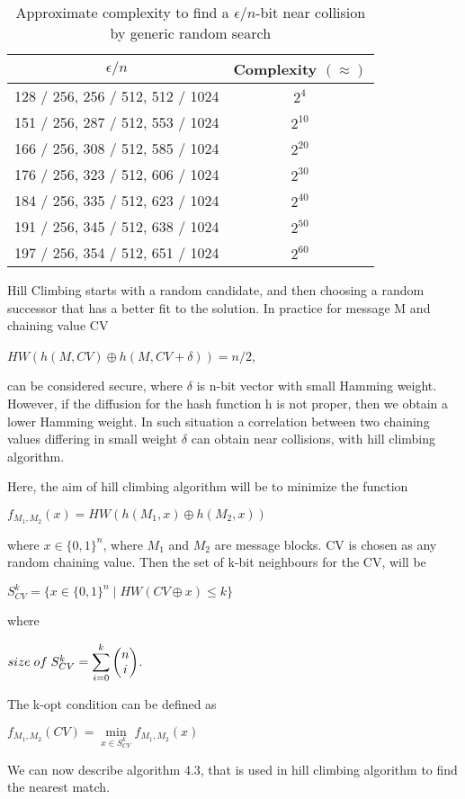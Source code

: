 \begin{table}[h]
  \begin{center}
    \begin{tabular}{ | c | c | } \hline
      $\epsilon / n $                         & Complexity $( \approx )$ \\ \hline
      128 / 256, 256 / 512, 512 / 1024 & $2^{4}$ \\ \hline
      151 / 256, 287 / 512, 553 / 1024 & $2^{10}$ \\ \hline
      166 / 256, 308 / 512, 585 / 1024 & $2^{20}$ \\ \hline
      176 / 256, 323 / 512, 606 / 1024 & $2^{30}$ \\ \hline
      184 / 256, 335 / 512, 623 / 1024 & $2^{40}$ \\ \hline
      191 / 256, 345 / 512, 638 / 1024 & $2^{50}$ \\ \hline
      197 / 256, 354 / 512, 651 / 1024 & $2^{60}$ \\ \hline
    \end{tabular}
    \caption{Approximate complexity to find a $\epsilon / n$-bit near collision by generic random search \cite{00029}}
  \end{center}
\end{table}

Hill Climbing starts with a random candidate, and then choosing a random successor that has a better fit to the
solution. In practice for message M and chaining value CV 
\begin{center}$HW( h(M, CV) \oplus h(M, CV + \delta) ) = n / 2 $,\end{center}
can be considered secure, where $\delta$ is n-bit vector with small Hamming weight. However, if the diffusion for the 
hash function h is not proper, then we obtain a lower Hamming weight. In such situation a correlation between two 
chaining values differing in small weight $\delta$ can obtain near collisions, with hill climbing algorithm.

Here, the aim of hill climbing algorithm will be to minimize the function 
\begin{center}$f_{M_{1}, M_{2}}(x) = HW( h(M_{1}, x) \oplus h(M_{2}, x) )$\end{center}
where $x \in \{0, 1\}^{n}$, where $M_{1}$ and $M_{2}$ are message blocks. CV is chosen as any random chaining value. Then the 
set of k-bit neighbours for the CV, will be 
\begin{center}$S^{k}_{CV} = \{ x \in \{0, 1\}^{n} \mid HW( CV \oplus x ) \leq k \}$\end{center}
where 
\begin{center}$ size \thickspace of \thickspace S^{k}_{CV} = \displaystyle \sum \limits_{i = 0}^{k} \begin{pmatrix} n \\ i \end{pmatrix}$.\end{center}
The k-opt condition can be defined as 
\begin{center}$f_{M_{1}, M_{2}} (CV) =  \min\limits_{x \in S^{k}_{CV}} f_{M_{1}, M_{2}} (x)$\end{center}
We can now describe algorithm 4.3, that is used in hill climbing algorithm to find the nearest match. 

